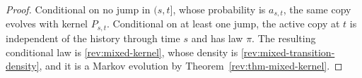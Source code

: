 \begin{proof}
Conditional on no jump in $(s,t]$, whose probability is $a_{s,t}$, the same
copy evolves with kernel $P_{s,t}$.  Conditional on at least one jump, the
active copy at $t$ is independent of the history through time $s$ and has law
$\pi$.  The resulting conditional law is \eqref{rev:mixed-kernel}, whose
density is \eqref{rev:mixed-transition-density}, and it is a
Markov evolution by Theorem~\ref{rev:thm-mixed-kernel}.
\end{proof}
